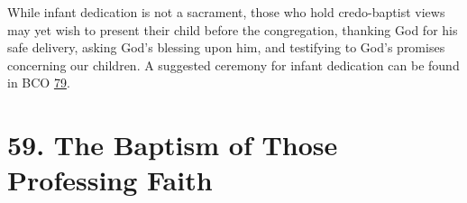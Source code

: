 \documentclass[
]{book}
\begin{document}
\protect\hypertarget{chapter-slug-58-a-note-on-infant-dedication}{\href{}{}}

\protect\hypertarget{58}{\href{}{}}While infant dedication is not a sacrament, those who hold credo-baptist views may yet wish to present their child before the congregation, thanking God for his safe delivery, asking God's blessing upon him, and testifying to God's promises concerning our children. A suggested ceremony for infant dedication can be found in BCO \protect\hyperlink{79}{79}.

\hypertarget{the-baptism-of-those-professing-faith}{%
\section*{59. The Baptism of Those Professing Faith}\label{the-baptism-of-those-professing-faith}}

\protect\hypertarget{chapter-slug-59-the-baptism-of-those-professing-faith}{\href{}{}}
\end{document}

